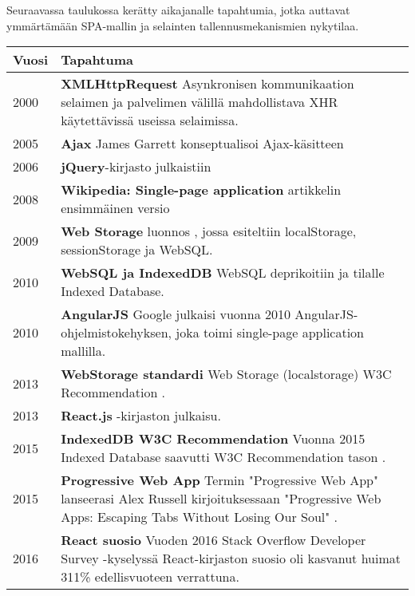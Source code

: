 \documentclass[finnish,twoside,censored,csm,sw-track-2018]{HYthesisML}
\begin{document}
Seuraavassa taulukossa kerätty aikajanalle tapahtumia, jotka auttavat ymmärtämään SPA-mallin ja selainten tallennusmekanismien nykytilaa.

\clearpage

\begin{center}
\begin{tabular}{ | m{2cm} | m{12cm} | } 
 \hline
 \textbf{Vuosi} & \textbf{Tapahtuma} \\ 
 \hline
 2000 & \textbf{XMLHttpRequest} Asynkronisen kommunikaation selaimen ja palvelimen välillä mahdollistava XHR käytettävissä useissa selaimissa. \citep{pwa-coined}\\ 
 \hline
 2005 & \textbf{Ajax} James Garrett konseptualisoi Ajax-käsitteen \citep{Ajax}\\ 
 \hline
 2006 & \textbf{jQuery}-kirjasto julkaistiin \citep{JSdefguide}\\
 \hline
 2008 & \textbf{Wikipedia: Single-page application} artikkelin ensimmäinen versio \citep{wikiSPA-2008} \\
 \hline
 2009 & \textbf{Web Storage} luonnos \citep{W3C-2009-webstorage}, jossa esiteltiin localStorage, sessionStorage ja WebSQL.\\
 \hline
 2010 & \textbf{WebSQL ja IndexedDB} WebSQL deprikoitiin \citep{W3C-2010-sqldatabase} ja tilalle \citep{W3C-2010-indexeddb} Indexed Database.\\
 \hline
  2010 & \textbf{AngularJS} Google julkaisi vuonna 2010 AngularJS-ohjelmistokehyksen, joka toimi single-page application mallilla. \citep{angularJS-release} \\
 \hline
 2013 & \textbf{WebStorage standardi} Web Storage (localstorage) W3C Recommendation \citep{W3C-2013-webstorage}. \\
 \hline
 2013 & \textbf{React.js} -kirjaston julkaisu. \\
 \hline
 2015 & \textbf{IndexedDB W3C Recommendation} Vuonna 2015 Indexed Database saavutti W3C Recommendation tason \citep{W3C-2015-indexeddb}. \\
 \hline
 2015 & \textbf{Progressive Web App} Termin "Progressive Web App" lanseerasi Alex Russell kirjoituksessaan "Progressive Web Apps: Escaping Tabs Without Losing Our Soul" \citep{pwa-coined}. \\
 \hline
 2016 & \textbf{React suosio} Vuoden 2016 Stack Overflow Developer Survey -kyselyssä \citep{SO-survey-2016} React-kirjaston suosio oli kasvanut huimat 311\% edellisvuoteen verrattuna. \\
 \hline
\end{tabular}
\end{center}
\end{document}
